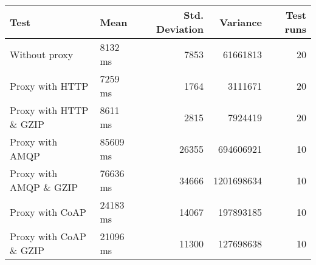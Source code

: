 \begin{tabularx}{\textwidth}{llrrr}
\hline
 Test                   & Mean     &   Std. Deviation &   Variance &   Test runs \\
\hline
 Without proxy          & 8132 ms  &             7853 &   61661813 &          20 \\
 Proxy with HTTP        & 7259 ms  &             1764 &    3111671 &          20 \\
 Proxy with HTTP \& GZIP & 8611 ms  &             2815 &    7924419 &          20 \\
 Proxy with AMQP        & 85609 ms &            26355 &  694606921 &          10 \\
 Proxy with AMQP \& GZIP & 76636 ms &            34666 & 1201698634 &          10 \\
 Proxy with CoAP        & 24183 ms &            14067 &  197893185 &          10 \\
 Proxy with CoAP \& GZIP & 21096 ms &            11300 &  127698638 &          10 \\
\hline
\end{tabularx}